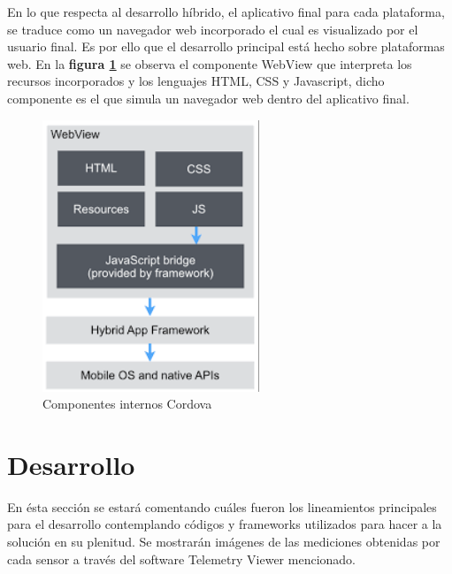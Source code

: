 \documentclass{IEEEtran}
\begin{document}
			En lo que respecta al desarrollo híbrido, el aplicativo final para cada plataforma, se traduce como un navegador web incorporado el cual es visualizado por el usuario final. Es por ello que el desarrollo principal está hecho sobre plataformas web. En la \textbf{figura \ref{ionic-angular-cordova-webview}} se observa el componente WebView que interpreta los recursos incorporados y los lenguajes HTML, CSS y Javascript, dicho componente es el que simula un navegador web dentro del aplicativo final.

			\begin{figure}
				\centering
				\includegraphics[width=0.6\linewidth]{ionic-angular-cordova-webview}
				\caption{Componentes internos Cordova}
				\label{ionic-angular-cordova-webview}
			\end{figure}
			
	\section{Desarrollo}

		En ésta sección se estará comentando cuáles fueron los lineamientos principales para el desarrollo contemplando códigos y frameworks utilizados para hacer a la solución en su plenitud. Se mostrarán imágenes de las mediciones obtenidas por cada sensor a través del software Telemetry Viewer mencionado.
\end{document}
